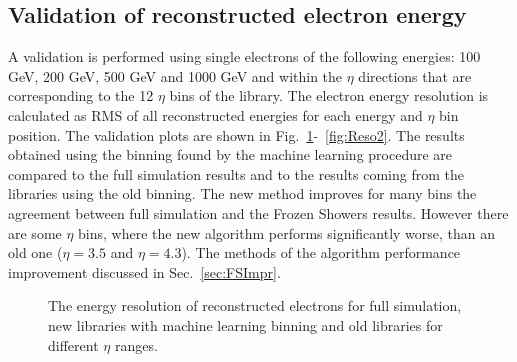 \subsection{Validation of reconstructed electron energy}

A validation is performed using  single electrons of the following  energies: 100 GeV, 200 GeV, 500 GeV and 1000 GeV and within the $\eta$ directions that are corresponding to the 12 $\eta$ bins of the library. The electron energy resolution is calculated as RMS of all reconstructed energies for each energy and $\eta$ bin position. The validation plots are shown in Fig.~\ref{fig:Reso}-~\ref{fig:Reso2}. The results obtained using the binning found by the machine learning procedure are compared to the full simulation results and to the results coming from the libraries using the old binning. The new method improves for many bins the agreement between full simulation and the Frozen Showers results. However there are some $\eta$ bins, where the new algorithm performs significantly worse, than an old one ($\eta=3.5$ and $\eta=4.3$). The methods of the algorithm performance  improvement discussed in Sec.~\ref{sec:FSImpr}.


\begin{figure}[!tbp]
\begin{minipage}[h]{0.45\linewidth}
\end{minipage}
\hfill
\begin{minipage}[h]{0.45\linewidth}
\end{minipage}
\vfill
\begin{minipage}[h]{0.45\linewidth}
\end{minipage}
\hfill
\begin{minipage}[h]{0.45\linewidth}
\end{minipage}
\vfill
\begin{minipage}[h]{0.45\linewidth}
\end{minipage}
\hfill
\begin{minipage}[h]{0.45\linewidth}
\end{minipage}
\caption{The energy resolution of reconstructed electrons for full simulation, new libraries with machine learning binning and old libraries for different $\eta$ ranges.}
\label{fig:Reso}
\end{figure}

